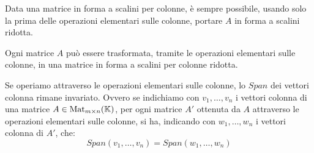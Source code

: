 \begin{proposition}
	Data una matrice in forma a scalini per colonne, è sempre possibile, usando
	solo la prima delle operazioni elementari sulle colonne, portare $A$ in forma
	a scalini ridotta.
\end{proposition}

\begin{corollary}
	Ogni matrice $A$ può essere trasformata, tramite le operazioni elementari
	sulle colonne, in una matrice in forma a scalini per colonne ridotta.
\end{corollary}

\begin{proposition}
	Se operiamo attraverso le operazioni elementari sulle colonne, lo
	$Span$ dei vettori colonna rimane invariato. Ovvero se indichiamo con
	$v_1, \dots, v_n$ i vettori colonna di una matrice
	$A \in \operatorname{Mat}_{m \times n}(\mathbb{K})$, per ogni matrice $A'$ ottenuta da $A$
	attraverso le operazioni elementari sulle colonne, si ha, indicando con
	$w_1, \dots, w_n$ i vettori colonna di $A'$, che:
	\[
		Span(v_1, \dots, v_n) = Span(w_1, \dots, w_n)
	\]
\end{proposition}
